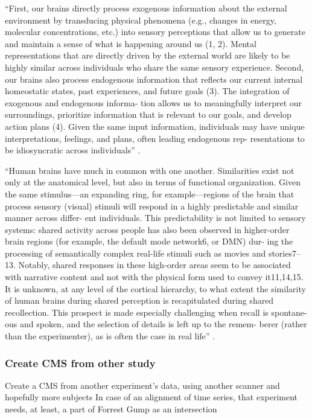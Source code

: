 ``First, our brains directly process exogenous information about the external
environment by transducing physical phenomena (e.g., changes in energy,
molecular concentrations, etc.) into sensory perceptions that allow us to
generate and maintain a sense of what is happening around us (1, 2). Mental
representations that are directly driven by the external world are likely to be
highly similar across individuals who share the same sensory experience. Second,
our brains also process endogenous information that reflects our current
internal homeostatic states, past experiences, and future goals (3). The
integration of exogenous and endogenous informa- tion allows us to meaningfully
interpret our surroundings, prioritize information that is relevant to our
goals, and develop action plans (4). Given the same input information,
individuals may have unique interpretations, feelings, and plans, often leading
endogenous rep- resentations to be idiosyncratic across individuals''
\citep{chang2021endogenous}.

``Human brains have much in common with one another. Similarities exist not only
at the anatomical level, but also in terms of functional organization. Given the
same stimulus—an expanding ring, for example—regions of the brain that process
sensory (visual) stimuli will respond in a highly predictable and similar manner
across differ- ent individuals. This predictability is not limited to sensory
systems: shared activity across people has also been observed in higher-order
brain regions (for example, the default mode network6, or DMN) dur- ing the
processing of semantically complex real-life stimuli such as movies and
stories7–13. Notably, shared responses in these high-order areas seem to be
associated with narrative content and not with the physical form used to convey
it11,14,15. It is unknown, at any level of the cortical hierarchy, to what
extent the similarity of human brains during shared perception is recapitulated
during shared recollection. This prospect is made especially challenging when
recall is spontane- ous and spoken, and the selection of details is left up to
the remem- berer (rather than the experimenter), as is often the case in real
life'' \citep{chen2017shared}.



\subsubsection{Create CMS from other study}

%
Create a CMS from another experiment's data,
using another scanner and hopefully more subjects
%
In case of an alignment of time series,
that experiment needs, at least, a part of Forrest Gump as an intersection



